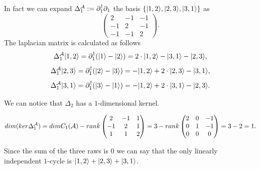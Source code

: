 \documentclass[../2.tex]{subfiles}
\begin{document}
    \begin{exa}
        In fact we can expand $\Delta_1^{\mathcal{A}} := \partial_1^\dagger\partial_1$ the basis $\{| 1,2 \rangle,| 2,3 \rangle,| 3,1 \rangle\}$ as
        \[\begin{pmatrix}
            2 & -1 & -1  \\
            -1 & 2 & -1  \\
            -1& -1 & 2 
        \end{pmatrix}.\] 
        The laplacian matrix is calculated as follows
        \[\Delta_1^{\mathcal{A}}| 1,2 \rangle = \partial_1^\dagger(| 1 \rangle-| 2 \rangle) = 2\cdot| 1,2 \rangle-| 3,1 \rangle-| 2,3 \rangle,\]
        \[\Delta_1^{\mathcal{A}}| 2,3 \rangle = \partial_1^\dagger(| 2 \rangle-| 3 \rangle) = -| 1,2 \rangle+2\cdot| 2,3 \rangle-| 3,1 \rangle,\]
        \[\Delta_1^{\mathcal{A}}| 3,1 \rangle = \partial_1^\dagger(| 3 \rangle-| 1 \rangle) = -| 1,2 \rangle+2\cdot| 3,1 \rangle-| 2,3 \rangle.\]

        We can notice that $\Delta_2$ has a $1$-dimensional kernel.

        \[ dim(ker\Delta_1^{\mathcal{A}}) = dimC_1(\mathcal{A}) - rank
            \begin{pmatrix}
                2 & -1 & 1  \\
                -1 & 2 & 1  \\
                1& 1 & 2 
            \end{pmatrix} = 3 - rank
            \begin{pmatrix}
                2 & 0 & -1  \\
                0 & 1 & -1  \\
                0 & 0 & 0 
            \end{pmatrix} = 3 - 2 =  1. \]

        Since the sum of the three raws is $0$ we can say that the only linearly independent $1$-cycle is $| 1,2 \rangle+| 2,3 \rangle+| 3,1 \rangle$.
        \label{ex:2:3:2}
    \end{exa}
\end{document}
